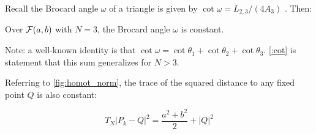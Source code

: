 Recall the Brocard angle $\omega$ of a triangle is given by $\cot\omega=L_{2,3}/(4A_3)$ \cite[Brocard Angle]{mw}. Then:

\begin{corollary}
Over $\mathcal{F}(a,b)$ with $N=3$, the Brocard angle $\omega$ is constant. 
\end{corollary}

Note: a well-known identity is that $\cot\omega=\cot\theta_1+\cot\theta_2+\cot\theta_3$.
\cref{:cot} is statement that this sum generalizes for $N>3$. 


Referring to \cref{fig:homot_norm}, the trace of the squared distance to any fixed point $Q$ is also constant:

\begin{equation}
\label{:p0}
T_N |P_k-Q|^2 = \frac{a^2 + b^2}{2} + |Q|^2
\end{equation}


